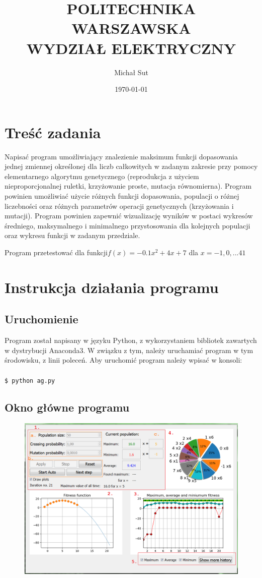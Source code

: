 \documentclass[a4paper,11pt]{article}
\title{POLITECHNIKA WARSZAWSKA \\ WYDZIAŁ ELEKTRYCZNY \\}
\author{Michał Sut}
\date{\today}
\begin{document}
	\thispagestyle{empty}
	\maketitle
	\date{}
	\section{Treść zadania}
	Napisać program umożliwiający znalezienie maksimum funkcji dopasowania jednej 
	zmiennej określonej dla liczb całkowitych w zadanym zakresie przy pomocy 
	elementarnego algorytmu genetycznego (reprodukcja z użyciem nieproporcjonalnej 
	ruletki, krzyżowanie proste, mutacja równomierna). Program powinien umożliwiać 
	użycie różnych funkcji dopasowania, populacji o różnej liczebności oraz różnych 
	parametrów operacji genetycznych (krzyżowania i mutacji). Program powinien 
	zapewnić wizualizację wyników w postaci wykresów średniego, maksymalnego 
	i minimalnego przystosowania dla kolejnych populacji oraz wykresu funkcji 
	w zadanym przedziale. 
	
	Program przetestować dla funkcji$ f(x)= -0.1x^2 + 4x + 7 $ dla $x= -1, 0, ... 41 $

	\section{Instrukcja działania programu}
		\subsection{Uruchomienie}
			Program został napisany w języku Python, z wykorzystaniem bibliotek zawartych w dystrybucji Anaconda3. W związku z tym, należy uruchamiać program w tym środowisku, z linii poleceń. Aby uruchomić program należy wpisać w konsoli:\\~\\
			\texttt{\$ python ag.py} 
		\subsection{Okno główne programu}
			\begin{figure}[H]
				\centering
				\includegraphics[scale=0.6]{main_window2.png}
			\end{figure}
		
\end{document}
